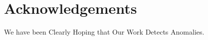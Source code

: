 \section{Acknowledgements}
\label{sec:acknowledgements}

We have been Clearly Hoping that Our Work Detects Anomalies.
